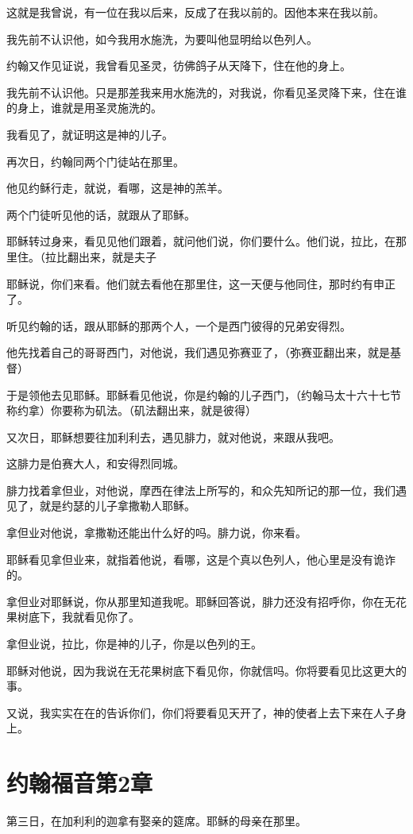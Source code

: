 \documentclass[12pt,oneside]{book}
\begin{document}
这就是我曾说，有一位在我以后来，反成了在我以前的。因他本来在我以前。

我先前不认识他，如今我用水施洗，为要叫他显明给以色列人。

约翰又作见证说，我曾看见圣灵，彷佛鸽子从天降下，住在他的身上。

我先前不认识他。只是那差我来用水施洗的，对我说，你看见圣灵降下来，住在谁的身上，谁就是用圣灵施洗的。

我看见了，就证明这是神的儿子。

再次日，约翰同两个门徒站在那里。

他见约稣行走，就说，看哪，这是神的羔羊。

两个门徒听见他的话，就跟从了耶稣。

耶稣转过身来，看见见他们跟着，就问他们说，你们要什么。他们说，拉比，在那里住。（拉比翻出来，就是夫子

耶稣说，你们来看。他们就去看他在那里住，这一天便与他同住，那时约有申正了。

听见约翰的话，跟从耶稣的那两个人，一个是西门彼得的兄弟安得烈。

他先找着自己的哥哥西门，对他说，我们遇见弥赛亚了，（弥赛亚翻出来，就是基督）

于是领他去见耶稣。耶稣看见他说，你是约翰的儿子西门，（约翰马太十六十七节称约拿）你要称为矶法。（矶法翻出来，就是彼得）

又次日，耶稣想要往加利利去，遇见腓力，就对他说，来跟从我吧。

这腓力是伯赛大人，和安得烈同城。

腓力找着拿但业，对他说，摩西在律法上所写的，和众先知所记的那一位，我们遇见了，就是约瑟的儿子拿撒勒人耶稣。

拿但业对他说，拿撒勒还能出什么好的吗。腓力说，你来看。

耶稣看见拿但业来，就指着他说，看哪，这是个真以色列人，他心里是没有诡诈的。

拿但业对耶稣说，你从那里知道我呢。耶稣回答说，腓力还没有招呼你，你在无花果树底下，我就看见你了。

拿但业说，拉比，你是神的儿子，你是以色列的王。

耶稣对他说，因为我说在无花果树底下看见你，你就信吗。你将要看见比这更大的事。

又说，我实实在在的告诉你们，你们将要看见天开了，神的使者上去下来在人子身上。

\chapter{约翰福音第2章}
第三日，在加利利的迦拿有娶亲的筵席。耶稣的母亲在那里。
\end{document}
